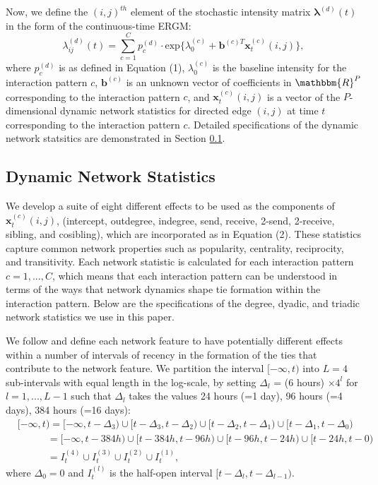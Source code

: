 \documentclass[a4paper]{article}
\begin{document}
Now, we define the $(i, j)^{th}$ element of the stochastic intensity matrix $\boldsymbol{\lambda}^{(d)}(t)$ in the form of the continuous-time ERGM:
\begin{equation}
\lambda^{(d)}_{ij}(t)=\sum\limits_{c=1}^{C} p^{(d)}_c
\cdot  \mbox{exp}\Big\{\lambda^{(c)}_0 + \boldsymbol{b}^{(c)T}\boldsymbol{x}^{(c)}_t(i, j)\Big\},
\end{equation}
where $p_c^{(d)}$ is as defined in Equation (1), $\lambda^{(c)}_0$ is the baseline intensity for the interaction pattern $c$, $\boldsymbol{b}^{(c)}$ is an unknown vector of coefficients in $\mathbbm{R}^{P}$ corresponding to the interaction pattern $c$, and $\boldsymbol{x}^{(c)}_t(i, j)$ is a vector of the $P$-dimensional dynamic network statistics for directed edge $(i, j)$ at time $t$ corresponding to the interaction pattern $c$. Detailed specifications of the dynamic network statsitics are demonstrated in Section \ref{subsec: Dynamic covariates2}.

\subsection{Dynamic Network Statistics} \label{subsec: Dynamic covariates2}
We develop a suite of eight different effects to be used as the components of $\boldsymbol{x}^{(c)}_t(i, j)$, (intercept, outdegree, indegree, send, receive, 2-send, 2-receive, sibling, and cosibling), which are incorporated as in Equation (2).  These statistics capture common network properties such as popularity, centrality, reciprocity, and transitivity. Each network statistic is calculated for each interaction pattern $c=1,...,C$, which means that each interaction pattern can be understood in terms of the ways that network dynamics shape tie formation within the interaction pattern. Below are the specifications of the degree, dyadic, and triadic network statistics we use in this paper.

We follow \cite{PerryWolfe2012} and define each network feature to have potentially different effects within a number of intervals of recency in the formation of the ties that contribute to the network feature. We partition the interval $[-\infty, t)$ into $L=4$ sub-intervals with equal length in the log-scale, by setting $\Delta_l$ = (6 hours) $\times  4^l$ for $l=1,...,L-1$ such that $\Delta_l$ takes the values 24 hours (=1 day), 96 hours (=4 days), 384 hours (=16 days): 
\begin{equation*}
\begin{aligned}
&[-\infty,t) =[-\infty,t-\Delta_3)\cup [t-\Delta_3, t-\Delta_{2}) \cup [t-\Delta_{2}, t-\Delta_{1})\cup [t-\Delta_1, t-\Delta_{0})\\& \quad\quad\quad= [-\infty,t-384h)\cup [t-384h, t-96h) \cup [t-96h, t-24h)\cup [t-24h, t-0)
\\& \quad\quad\quad=I_t^{(4)}\cup  I_t^{(3)}\cup  I_t^{(2)}\cup I_t^{(1)},
\end{aligned}
\end{equation*}
where $\Delta_0 = 0$ and $I_{t}^{(l)} $ is the half-open interval $[t-\Delta_l, t-\Delta_{l-1})$. 
\end{document}
